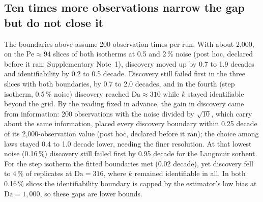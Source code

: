 \documentclass[11pt]{article}
\newcommand{\Da}{\mathrm{Da}}
\newcommand{\Pe}{\mathrm{Pe}}
\begin{document}
\subsection*{Ten times more observations narrow the gap but do not close it}
The boundaries above assume 200 observation times per run. With about 2,000, on the $\Pe \approx 94$ slices of both isotherms at 0.5 and 2\,\% noise (post hoc,
declared before it ran; Supplementary Note~1), discovery moved up by 0.7 to 1.9 decades and identifiability by 0.2 to
0.5 decade. Discovery still failed first in the three slices with both boundaries, by 0.7 to 2.0 decades, and in
the fourth (step isotherm, 0.5\,\% noise) discovery reached $\Da \approx 310$
while $k$ stayed identifiable beyond the grid. By the reading fixed in advance, the gain in discovery came
from information: 200 observations
with the noise divided by $\sqrt{10}$, which carry about the same information, placed every discovery
boundary within 0.25 decade of its 2,000-observation value (post hoc, declared before it ran); the choice
among laws stayed 0.4 to 1.0 decade lower, needing the finer resolution. At that
lowest noise (0.16\,\%) discovery still failed first by 0.95 decade for the Langmuir sorbent. For
the step isotherm the fitted boundaries met (0.02 decade), yet discovery fell to
4\,\% of replicates at $\Da = 316$, where $k$ remained identifiable in all. In both 0.16\,\% slices the identifiability
boundary is capped by the estimator's low bias at $\Da = 1{,}000$, so these gaps are lower bounds.
\end{document}
